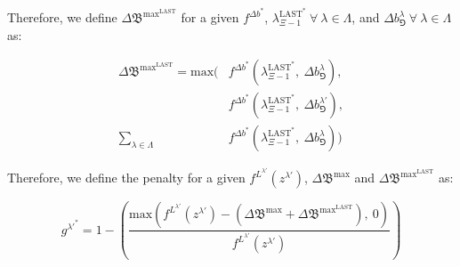 \documentclass[class=article, crop=false]{standalone}
\begin{document}
\begin{enumerate}
    
    Therefore, we define $\Delta \mathfrak{B}^{\text{max}^{\text{LAST}}}$ for a given $f^{\Delta b^{*}}$, $\lambda_{\Xi-1}^{\text{LAST}^{*}}\ \forall\ \lambda \in \Lambda$, and $\Delta b_{\Game}^{\lambda}\ \forall\ \lambda \in \Lambda$ as:

        \begin{align*}
            \Delta \mathfrak{B}^{\text{max}^{\text{LAST}}} = 
                \text{max} \Bigg(
                    & f^{\Delta b^{*}}
                    (\lambda_{\Xi-1}^{\text{LAST}^{*}},\ \Delta b_{\Game}^{\lambda}),
                    \\
                    & f^{\Delta b^{*}}
                    (\lambda_{\Xi-1}^{\text{LAST}^{*}},\ \Delta b_{\Game}^{\lambda'}),
                    \\
                    \sum_{\lambda \in \Lambda}
                    & f^{\Delta b^{*}}
                    (\lambda_{\Xi-1}^{\text{LAST}^{*}},\ \Delta b_{\Game}^{\lambda})
                \Bigg)
        \end{align*}

    Therefore, we define the  penalty for a given $f^{L^{\lambda'}}(z^{\lambda'})$, $\Delta \mathfrak{B}^\text{max}$ and $\Delta \mathfrak{B}^{\text{max}^{\text{LAST}}}$ as:

        $$
             g^{\lambda'^{*}} = 1 - 
                \left( \frac{\text{max}(f^{L^{\lambda'}}(z^{\lambda'}) - 
                     (\Delta \mathfrak{B}^\text{max} + \Delta \mathfrak{B}^{\text{max}^{\text{LAST}}}),\ 0)}
                     {f^{L^{\lambda'}}(z^{\lambda'})} 
                \right)
        $$


\end{enumerate}
\end{document}
